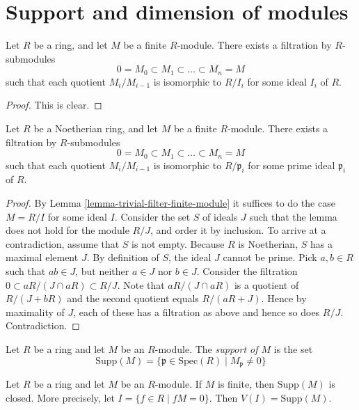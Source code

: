 \section{Support and dimension of modules}
\label{section-support}

\begin{lemma}
\label{lemma-trivial-filter-finite-module}
Let $R$ be a ring, and let $M$ be a finite $R$-module.
There exists a filtration by $R$-submodules
$$
0 = M_0 \subset M_1 \subset \ldots \subset M_n = M
$$
such that each quotient $M_i/M_{i-1}$ is isomorphic
to $R/I_i$ for some ideal $I_i$ of $R$.
\end{lemma}

\begin{proof}
This is clear.
\end{proof}

\begin{lemma}
\label{lemma-filter-Noetherian-module}
Let $R$ be a Noetherian ring, and let $M$ be a finite $R$-module.
There exists a filtration by $R$-submodules
$$
0 = M_0 \subset M_1 \subset \ldots \subset M_n = M
$$
such that each quotient $M_i/M_{i-1}$ is isomorphic
to $R/\mathfrak p_i$ for some prime ideal $\mathfrak p_i$
of $R$.
\end{lemma}

\begin{proof}
By Lemma \ref{lemma-trivial-filter-finite-module}
it suffices to do the case $M = R/I$ for some ideal $I$.
Consider the set $S$ of ideals $J$ such that the lemma
does not hold for the module $R/J$, and order it by
inclusion. To arrive at a
contradiction, assume that $S$ is not empty. Because
$R$ is Noetherian, $S$ has a maximal element $J$.
By definition of $S$, the ideal $J$ cannot be prime.
Pick $a, b\in R$ such that $ab \in J$, but neither
$a \in J$ nor $b\in J$. Consider the filtration
$0 \subset aR/(J \cap aR) \subset R/J$.
Note that $aR/(J \cap aR)$ is a quotient of $R/(J + bR)$
and the second quotient equals $R/(aR + J)$. Hence by
maximality of $J$, each of these has a filtration as
above and hence so does $R/J$. Contradiction.
\end{proof}

\begin{definition}
\label{definition-support-module}
Let $R$ be a ring and let $M$ be an $R$-module.
The {\it support of $M$} is the set
$$
\text{Supp}(M)
=
\{
\mathfrak p \in \text{Spec}(R)
\mid
M_{\mathfrak p} \not= 0
\}
$$
\end{definition}

\begin{lemma}
\label{lemma-support-closed}
Let $R$ be a ring and let $M$ be an $R$-module.
If $M$ is finite, then $\text{Supp}(M)$ is closed.
More precisely, let $I = \{f \in R \mid fM = 0\}$.
Then $V(I) = \text{Supp}(M)$.
\end{lemma}

